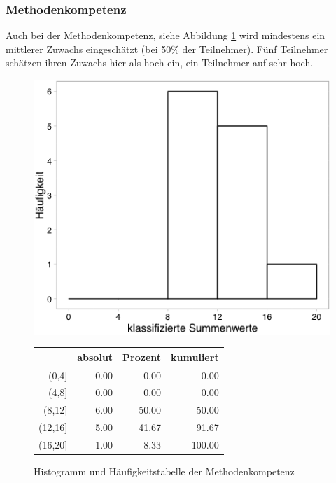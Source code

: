 \documentclass[12pt, bibliography=totoc]{scrartcl}
\begin{document}
\subsubsection{Methodenkompetenz}\label{methodenkompetenz}

Auch bei der Methodenkompetenz, siehe Abbildung \ref{fig:MK} wird
mindestens ein mittlerer Zuwachs eingeschätzt (bei 50\% der Teilnehmer).
Fünf Teilnehmer schätzen ihren Zuwachs hier als hoch ein, ein Teilnehmer
auf sehr hoch.

\begin{figure}[H]
\begin{minipage}{.4\linewidth}
\includegraphics[width=0.8\linewidth]{Anhang/MKHistnn.png}


\end{minipage}
\begin{minipage}{.4\linewidth}
\centering
\raisebox{\depth}
{\begin{tabular}{rrrr}
  \hline
 & absolut & Prozent & kumuliert \\ 
  \hline
(0,4] & 0.00 & 0.00 & 0.00 \\ 
  (4,8] & 0.00 & 0.00 & 0.00 \\ 
  (8,12] & 6.00 & 50.00 & 50.00 \\ 
  (12,16] & 5.00 & 41.67 & 91.67 \\ 
  (16,20] & 1.00 & 8.33 & 100.00 \\ 
   \hline
\end{tabular}

}
\label{tab:defis}
\end{minipage}
\caption{Histogramm und Häufigkeitstabelle der Methodenkompetenz}
\label{fig:MK}
\end{figure}
\end{document}
